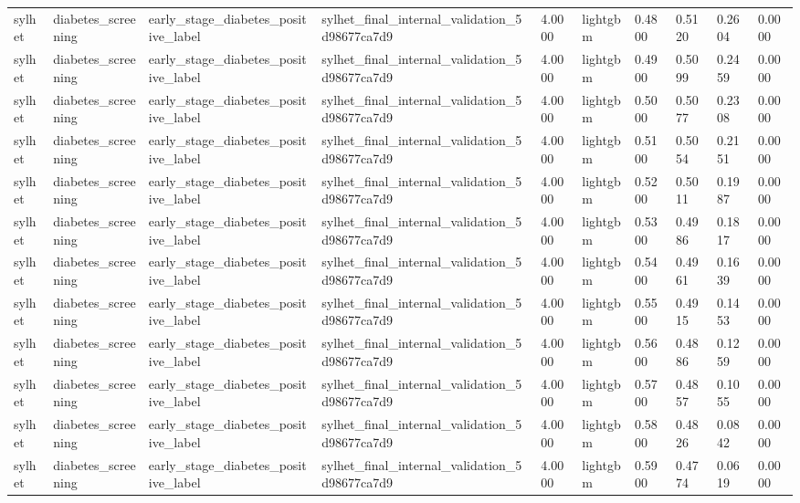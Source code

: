 \begin{tabular}{llllllllll}
sylhet & diabetes\_screening & early\_stage\_diabetes\_positive\_label & sylhet\_final\_internal\_validation\_5d98677ca7d9 & 4.0000 & lightgbm & 0.4800 & 0.5120 & 0.2604 & 0.0000 \\
sylhet & diabetes\_screening & early\_stage\_diabetes\_positive\_label & sylhet\_final\_internal\_validation\_5d98677ca7d9 & 4.0000 & lightgbm & 0.4900 & 0.5099 & 0.2459 & 0.0000 \\
sylhet & diabetes\_screening & early\_stage\_diabetes\_positive\_label & sylhet\_final\_internal\_validation\_5d98677ca7d9 & 4.0000 & lightgbm & 0.5000 & 0.5077 & 0.2308 & 0.0000 \\
sylhet & diabetes\_screening & early\_stage\_diabetes\_positive\_label & sylhet\_final\_internal\_validation\_5d98677ca7d9 & 4.0000 & lightgbm & 0.5100 & 0.5054 & 0.2151 & 0.0000 \\
sylhet & diabetes\_screening & early\_stage\_diabetes\_positive\_label & sylhet\_final\_internal\_validation\_5d98677ca7d9 & 4.0000 & lightgbm & 0.5200 & 0.5011 & 0.1987 & 0.0000 \\
sylhet & diabetes\_screening & early\_stage\_diabetes\_positive\_label & sylhet\_final\_internal\_validation\_5d98677ca7d9 & 4.0000 & lightgbm & 0.5300 & 0.4986 & 0.1817 & 0.0000 \\
sylhet & diabetes\_screening & early\_stage\_diabetes\_positive\_label & sylhet\_final\_internal\_validation\_5d98677ca7d9 & 4.0000 & lightgbm & 0.5400 & 0.4961 & 0.1639 & 0.0000 \\
sylhet & diabetes\_screening & early\_stage\_diabetes\_positive\_label & sylhet\_final\_internal\_validation\_5d98677ca7d9 & 4.0000 & lightgbm & 0.5500 & 0.4915 & 0.1453 & 0.0000 \\
sylhet & diabetes\_screening & early\_stage\_diabetes\_positive\_label & sylhet\_final\_internal\_validation\_5d98677ca7d9 & 4.0000 & lightgbm & 0.5600 & 0.4886 & 0.1259 & 0.0000 \\
sylhet & diabetes\_screening & early\_stage\_diabetes\_positive\_label & sylhet\_final\_internal\_validation\_5d98677ca7d9 & 4.0000 & lightgbm & 0.5700 & 0.4857 & 0.1055 & 0.0000 \\
sylhet & diabetes\_screening & early\_stage\_diabetes\_positive\_label & sylhet\_final\_internal\_validation\_5d98677ca7d9 & 4.0000 & lightgbm & 0.5800 & 0.4826 & 0.0842 & 0.0000 \\
sylhet & diabetes\_screening & early\_stage\_diabetes\_positive\_label & sylhet\_final\_internal\_validation\_5d98677ca7d9 & 4.0000 & lightgbm & 0.5900 & 0.4774 & 0.0619 & 0.0000 \\

\end{tabular}
